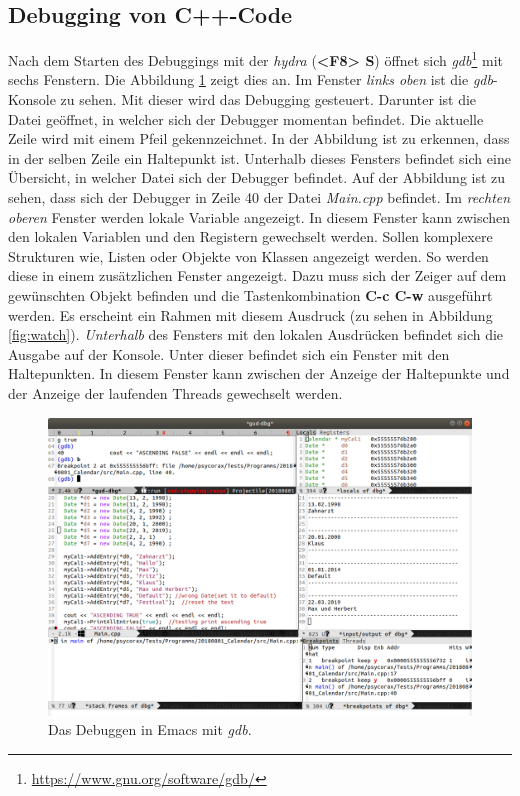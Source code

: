\subsection{Debugging von C++-Code}
\label{subsec:debugc++}
Nach dem Starten des Debuggings mit der \textit{hydra} (\textbf{<F8>
  S}) öffnet sich
\textit{gdb}\footnote{\url{https://www.gnu.org/software/gdb/}} mit
sechs Fenstern. Die Abbildung \ref{fig:debug} zeigt dies an. Im
Fenster \textit{links oben} ist die \textit{gdb}-Konsole zu sehen. Mit
dieser wird das Debugging gesteuert. Darunter ist die Datei geöffnet,
in welcher sich der Debugger momentan befindet. Die aktuelle Zeile
wird mit einem Pfeil gekennzeichnet. In der Abbildung ist zu erkennen,
dass in der selben Zeile ein Haltepunkt ist. Unterhalb dieses Fensters
befindet sich eine Übersicht, in welcher Datei sich der Debugger
befindet. Auf der Abbildung ist zu sehen, dass sich der Debugger in
Zeile 40 der Datei \textit{Main.cpp} befindet. Im \textit{rechten
  oberen} Fenster werden lokale Variable angezeigt. In diesem Fenster
kann zwischen den lokalen Variablen und den Registern gewechselt
werden. Sollen komplexere Strukturen wie, Listen oder Objekte von
Klassen angezeigt werden. So werden diese in einem zusätzlichen
Fenster angezeigt. Dazu muss sich der Zeiger auf dem gewünschten
Objekt befinden und die Tastenkombination \textbf{C-c C-w} ausgeführt
werden. Es erscheint ein Rahmen mit diesem Ausdruck (zu sehen in
Abbildung \ref{fig:watch}). \textit{Unterhalb} des Fensters mit den
lokalen Ausdrücken befindet sich die Ausgabe auf der Konsole. Unter
dieser befindet sich ein Fenster mit den Haltepunkten. In diesem
Fenster kann zwischen der Anzeige der Haltepunkte und der Anzeige der
laufenden Threads gewechselt werden.\\

\begin{figure}[H]
  \centering
  \includegraphics[width=.95\textheight, angle=90]{./images/Workflow/debugversch.png}
  \caption{\label{fig:debug} Das Debuggen in Emacs mit \textit{gdb}.}
\end{figure}


